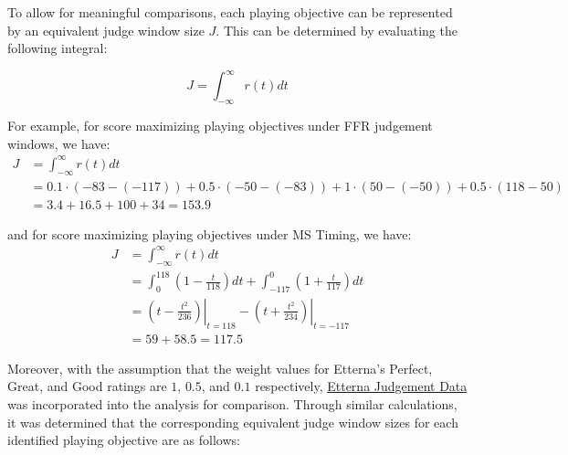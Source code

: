 To allow for meaningful comparisons, each playing objective can be represented by an equivalent judge window size $J$. This can be determined by evaluating the following integral:

$$J = \displaystyle \int_{-\infty}^{\infty} r(t) dt$$

For example, for score maximizing playing objectives under FFR judgement windows, we have:
\begin{align*}
J &= \displaystyle \int_{-\infty}^{\infty} r(t) dt \\
& = 0.1 \cdot (-83 - (-117)) + 0.5 \cdot (-50 - (-83)) + 1 \cdot (50 - (-50)) + 0.5 \cdot (118 - 50) \\
&= 3.4 + 16.5 + 100 + 34 = 153.9
\end{align*}

and for score maximizing playing objectives under MS Timing, we have:
\begin{align*}
J &= \displaystyle \int_{-\infty}^{\infty} r(t) dt \\
& = \int_{0}^{118} \left(1 - \frac{t}{118}\right) dt + \int_{-117}^{0} \left(1 + \frac{t}{117}\right) dt \\
&= \left. \left( t - \frac{t^2}{236} \right)\right|_{t = 118} - \left.\left( t + \frac{t^2}{234} \right) \right|_{t = - 117} \\
&= 59 + 58.5 = 117.5
\end{align*}

Moreover, with the assumption that the weight values for Etterna's Perfect, Great, and Good ratings are $1$, $0.5$, and $0.1$ respectively, \href{https://docs.google.com/spreadsheets/d/1syi5aN6sTiDA2Bs_lzZjsLQ1yCEhxl5EnAd6EsD6cF4/edit?gid=0#gid=0}{Etterna Judgement Data} was incorporated into the analysis for comparison. Through similar calculations, it was determined that the corresponding equivalent judge window sizes for each identified playing objective are as follows:

